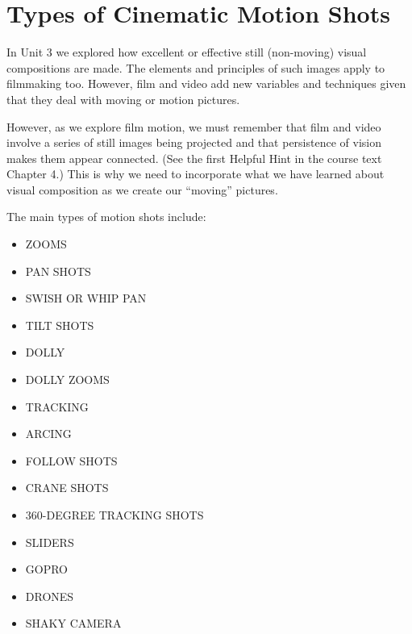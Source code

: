 \documentclass[
]{book}
\providecommand{\tightlist}{%
  \setlength{\itemsep}{0pt}\setlength{\parskip}{0pt}}
\begin{document}
\hypertarget{types-of-cinematic-motion-shots}{%
\section*{Types of Cinematic Motion Shots}\label{types-of-cinematic-motion-shots}}

In Unit 3 we explored how excellent or effective still (non-moving) visual compositions are made. The elements and principles of such images apply to filmmaking too. However, film and video add new variables and techniques given that they deal with moving or motion pictures.

However, as we explore film motion, we must remember that film and video involve a series of still images being projected and that persistence of vision makes them appear connected. (See the first Helpful Hint in the course text Chapter 4.) This is why we need to incorporate what we have learned about visual composition as we create our ``moving'' pictures.

The main types of motion shots include:

\begin{itemize}
\tightlist
\item
  ZOOMS\\
\item
  PAN SHOTS\\
\item
  SWISH OR WHIP PAN\\
\item
  TILT SHOTS\\
\item
  DOLLY\\
\item
  DOLLY ZOOMS\\
\item
  TRACKING\\
\item
  ARCING\\
\item
  FOLLOW SHOTS\\
\item
  CRANE SHOTS\\
\item
  360-DEGREE TRACKING SHOTS\\
\item
  SLIDERS\\
\item
  GOPRO\\
\item
  DRONES\\
\item
  SHAKY CAMERA
\end{itemize}
\end{document}
